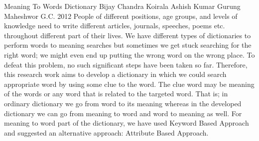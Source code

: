  \begin{conf-abstract}[]
{Meaning To Words Dictionary}
{
Bijay Chandra Koirala
Ashish Kumar Gurung
Maheshwor G.C.
}
{2012}
People of different positions, age groups, and levels of knowledge need to write different articles, journals, speeches, poems etc. throughout different part of their lives. We have different types of dictionaries to perform words to meaning searches but sometimes we get stuck searching for the right word; we might even end up putting the wrong word on the wrong place. To defeat this problem, no such significant steps have been taken so far. Therefore, this research work aims to develop a dictionary in which we could search appropriate word by using some clue to the word. The clue word may be meaning of the words or any word that is related to the targeted word. That is; in ordinary dictionary we go from word to its meaning whereas in the developed dictionary we can go from meaning to word and word to meaning as well. For meaning to word part of the dictionary, we have used Keyword Based Approach and suggested an alternative approach: Attribute Based Approach.
  \end{conf-abstract}